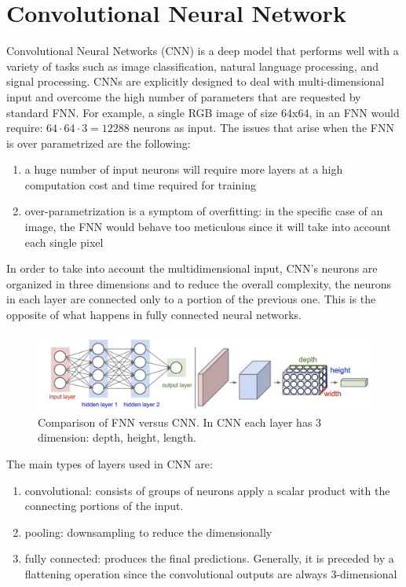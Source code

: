 \documentclass[LaM,binding=0.6cm]{sapthesis}
\begin{document}
\section{Convolutional Neural Network}
Convolutional Neural Networks (CNN) is a deep model that performs well with a variety of tasks such as image classification, natural language processing, and signal processing. CNNs are explicitly designed to deal with multi-dimensional input and overcome the high number of parameters that are requested by standard FNN. For example, a single RGB image of size 64x64, in an FNN would require: $64\cdot64\cdot3=12288$ neurons as input. The issues that arise when the FNN is over parametrized are the following:
\begin{enumerate}
\item a huge number of input neurons will require more layers at a high computation cost and time required for training 
\item over-parametrization is a symptom of overfitting: in the specific case of an image, the FNN would behave too meticulous since it will take into account each single pixel
\end{enumerate}
In order to take into account the multidimensional input, CNN's neurons are organized in three dimensions and to reduce the overall complexity, the neurons in each layer are connected only to a portion of the previous one. This is the opposite of what happens in fully connected neural networks. 
\begin{figure}   \centering
    \includegraphics[width=150mm,scale=0.7]{convgen}
    \caption{Comparison of FNN versus CNN. In CNN each layer has 3 dimension: depth, height, length.\cite{cnnsite}}
    \label{fig:convgen}
\end{figure}
The main types of layers used in CNN are:
\begin{enumerate}
\item convolutional: consists of groups of neurons apply a scalar product with the connecting portions of the input.
\item pooling: downsampling to reduce the dimensionally 
\item fully connected: produces the final predictions. Generally, it is preceded by a flattening operation since the convolutional outputs are always 3-dimensional
\end{enumerate}
\end{document}
